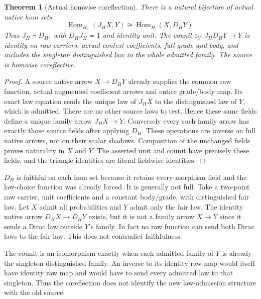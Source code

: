 \documentclass[11pt]{article}
\newtheorem{theorem}{Theorem}\newtheorem{proposition}[theorem]{Proposition}
\begin{document}
\begin{theorem}[Actual homwise coreflection]
There is a natural bijection of actual native hom sets
\[
 \operatorname{Hom}_{H_{\mathsf F}}(J_HX,Y)
 \cong\operatorname{Hom}_{H}(X,D_HY).
\]
Thus $J_H\dashv D_H$, with $D_HJ_H=1$ and identity unit. The counit
$\varepsilon_Y:J_HD_HY\to Y$ is identity on raw carriers, actual context coefficients, full grade and body, and includes the singleton distinguished law in the whole admitted family. The source is homwise coreflective.
\end{theorem}
\begin{proof}
A source native arrow $X\to D_HY$ already supplies the common raw function, actual augmented coefficient arrows and entire grade/body map. Its exact law equation sends the unique law of $J_HX$ to the distinguished law of $Y$, which is admitted. There are no other source laws to test. Hence these same fields define a unique family arrow $J_HX\to Y$. Conversely every such family arrow has exactly those source fields after applying $D_H$. These operations are inverse on full native arrows, not on their scalar shadows. Composition of the unchanged fields proves naturality in $X$ and $Y$. The asserted unit and counit have precisely these fields, and the triangle identities are literal fieldwise identities.\end{proof}

$D_H$ is faithful on each hom set because it retains every morphism field and the law-choice function was already forced. It is generally not full. Take a two-point raw carrier, unit coefficients and a constant body/grade, with distinguished fair law. Let $X$ admit all probabilities and $Y$ admit only the fair law. The identity native arrow $D_HX\to D_HY$ exists, but it is not a family arrow $X\to Y$ since it sends a Dirac law outside $Y$'s family. In fact no raw function can send both Dirac laws to the fair law. This does not contradict faithfulness.

The counit is an isomorphism exactly when each admitted family of $Y$ is already the singleton distinguished family. An inverse to its identity raw map would itself have identity raw map and would have to send every admitted law to that singleton. Thus the coreflection does not identify the new law-admission structure with the old source.
\end{document}
